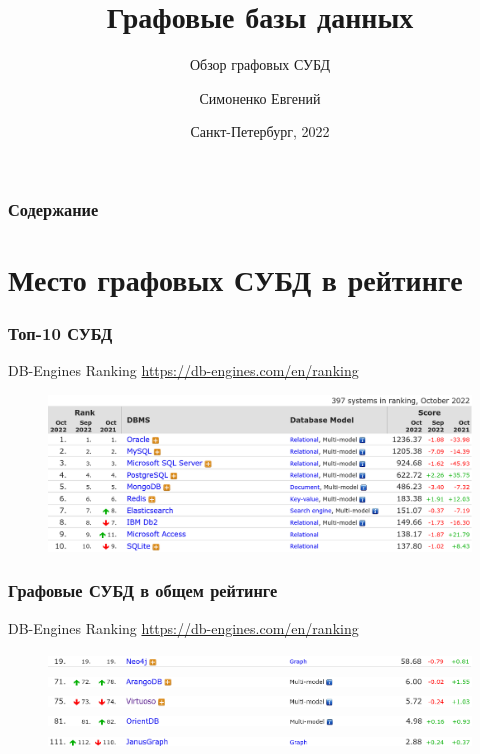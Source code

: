 \documentclass[11pt]{beamer}
\title[Графовые СУБД]{Графовые базы данных}
\subtitle{Обзор графовых СУБД}
\author[]{Симоненко Евгений}
\institute[]{Университет ИТМО}
\date[]{Санкт-Петербург, 2022}
\begin{document}
\begin{frame}
  \titlepage
\end{frame}

\begin{frame}
  \frametitle{Содержание}
  \tableofcontents
\end{frame}

\section{Место графовых СУБД в рейтинге}

\begin{frame}
  \frametitle{Топ-10 СУБД}
  DB-Engines Ranking \url{https://db-engines.com/en/ranking}
  \begin{figure}[h!]
    \includegraphics[width=\linewidth]{db-engines_top-10_2022-10-24_14-57-35.png}
  \end{figure}
\end{frame}

\begin{frame}
  \frametitle{Графовые СУБД в общем рейтинге}
  DB-Engines Ranking \url{https://db-engines.com/en/ranking}
  \begin{figure}[h!]
    \includegraphics[width=\linewidth]{db-engines_neo4j_2022-10-24_15-39-30.png}
    \includegraphics[width=\linewidth]{db-engines_arangodb_2022-10-24_15-40-56.png}
    \includegraphics[width=\linewidth]{db-engines_virtuoso_2022-10-24_15-46-33.png}
    \includegraphics[width=\linewidth]{db-engines_orientdb_2022-10-24_15-45-36.png}
    \includegraphics[width=\linewidth]{db-engines_janusgraph_2022-10-24_16-02-48.png}
  \end{figure}
\end{frame}
\end{document}
